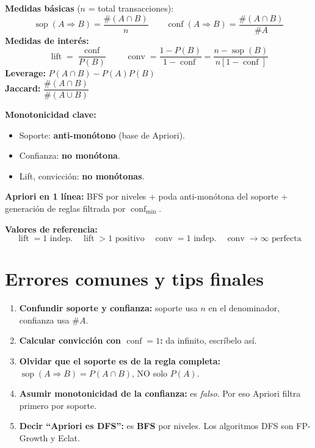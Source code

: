 \documentclass[11pt,a4paper]{article}
\newcommand{\conf}{\operatorname{conf}}
\newcommand{\sop}{\operatorname{sop}}
\newcommand{\lift}{\operatorname{lift}}
\newcommand{\conv}{\operatorname{conv}}
\begin{document}
\begin{formulabox}
\textbf{Medidas básicas} ($n$ = total transacciones):
\[
\sop(A \Rightarrow B) = \frac{\#(A \cap B)}{n} \qquad
\conf(A \Rightarrow B) = \frac{\#(A \cap B)}{\#A}
\]
\textbf{Medidas de interés:}
\[
\lift = \frac{\conf}{P(B)} \qquad
\conv = \frac{1 - P(B)}{1 - \conf} = \frac{n - \sop(B)}{n[1 - \conf]}
\]
\textbf{Leverage:} $P(A \cap B) - P(A)P(B)$ \\
\textbf{Jaccard:} $\dfrac{\#(A \cap B)}{\#(A \cup B)}$

\smallskip
\textbf{Monotonicidad clave:}
\begin{itemize}\setlength{\itemsep}{0pt}
    \item Soporte: \textbf{anti-monótono} (base de Apriori).
    \item Confianza: \textbf{no monótona}.
    \item Lift, convicción: \textbf{no monótonas}.
\end{itemize}

\textbf{Apriori en 1 línea:} BFS por niveles + poda anti-monótona del soporte + generación de reglas filtrada por $\conf_{\min}$.

\textbf{Valores de referencia:}
\[
\lift = 1 \text{ indep.}\quad \lift > 1 \text{ positivo}\quad
\conv = 1 \text{ indep.}\quad \conv \to \infty \text{ perfecta}
\]
\end{formulabox}

\section{Errores comunes y tips finales}

\begin{tipbox}
\begin{enumerate}
    \item \textbf{Confundir soporte y confianza:} soporte usa $n$ en el denominador,
          confianza usa $\#A$.
    \item \textbf{Calcular convicción con $\conf = 1$:} da infinito, escríbelo así.
    \item \textbf{Olvidar que el soporte es de la regla completa:} $\sop(A \Rightarrow B) = P(A \cap B)$, NO solo $P(A)$.
    \item \textbf{Asumir monotonicidad de la confianza:} es \emph{falso}. Por eso Apriori
          filtra primero por soporte.
    \item \textbf{Decir ``Apriori es DFS'':} es \textbf{BFS} por niveles.
          Los algoritmos DFS son FP-Growth y Eclat.
\end{enumerate}
\end{tipbox}
\end{document}
